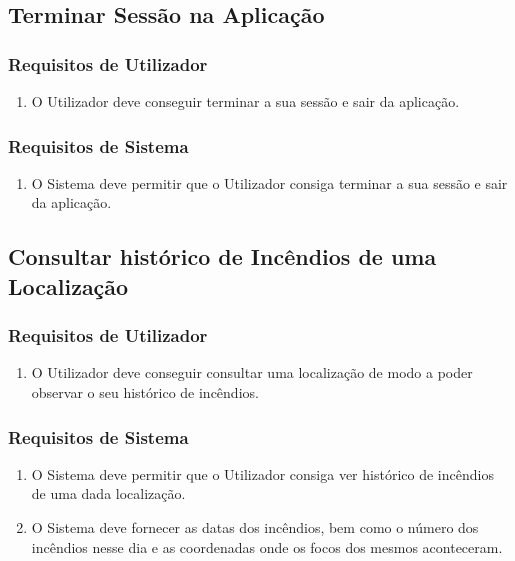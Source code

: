\documentclass[a4paper,12pt]{scrreprt}
\begin{document}
\subsection{Terminar Sessão na Aplicação}

\subsubsection{Requisitos de Utilizador}

\begin{enumerate}
    \item O Utilizador deve conseguir terminar a sua sessão e sair da aplicação.
\end{enumerate}

\subsubsection{Requisitos de Sistema }

\begin{enumerate}
    \item O Sistema deve permitir que o Utilizador consiga terminar a sua sessão e sair da aplicação.
\end{enumerate}

\clearpage
\subsection{Consultar histórico de Incêndios de uma Localização}

\subsubsection{Requisitos de Utilizador}

\begin{enumerate}
    \item O Utilizador deve conseguir consultar uma localização de modo a poder observar o seu histórico de incêndios.
\end{enumerate}

\subsubsection{Requisitos de Sistema }

\begin{enumerate}
    \item O Sistema deve permitir que o Utilizador consiga ver histórico de incêndios de uma dada localização.
    \item O Sistema deve fornecer as datas dos incêndios, bem como o número dos incêndios nesse dia e as coordenadas onde os focos dos mesmos aconteceram.
\end{enumerate}
\end{document}
